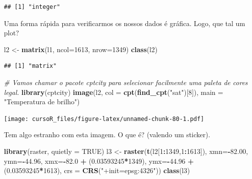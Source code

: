 \documentclass[]{book}
\newenvironment{Shaded}{\begin{snugshade}}{\end{snugshade}}
\newcommand{\KeywordTok}[1]{\textcolor[rgb]{0.13,0.29,0.53}{\textbf{#1}}}
\newcommand{\DataTypeTok}[1]{\textcolor[rgb]{0.13,0.29,0.53}{#1}}
\newcommand{\DecValTok}[1]{\textcolor[rgb]{0.00,0.00,0.81}{#1}}
\newcommand{\FloatTok}[1]{\textcolor[rgb]{0.00,0.00,0.81}{#1}}
\newcommand{\StringTok}[1]{\textcolor[rgb]{0.31,0.60,0.02}{#1}}
\newcommand{\CommentTok}[1]{\textcolor[rgb]{0.56,0.35,0.01}{\textit{#1}}}
\newcommand{\OtherTok}[1]{\textcolor[rgb]{0.56,0.35,0.01}{#1}}
\newcommand{\OperatorTok}[1]{\textcolor[rgb]{0.81,0.36,0.00}{\textbf{#1}}}
\newcommand{\NormalTok}[1]{#1}
\theoremstyle{definition}
\theoremstyle{definition}
\theoremstyle{definition}
\theoremstyle{remark}
\begin{document}
\begin{verbatim}
## [1] "integer"
\end{verbatim}

Uma forma rápida para verificarmos os nossos dados é gráfica. Logo, que
tal um plot?

\begin{Shaded}
\begin{Highlighting}[]
\NormalTok{l2 <-}\StringTok{ }\KeywordTok{matrix}\NormalTok{(l1, }\DataTypeTok{ncol=}\DecValTok{1613}\NormalTok{, }\DataTypeTok{nrow=}\DecValTok{1349}\NormalTok{)}
\KeywordTok{class}\NormalTok{(l2)}
\end{Highlighting}
\end{Shaded}

\begin{verbatim}
## [1] "matrix"
\end{verbatim}

\begin{Shaded}
\begin{Highlighting}[]
\CommentTok{# Vamos chamar o pacote cptcity para selecionar facilmente uma paleta de cores legal.}
\KeywordTok{library}\NormalTok{(cptcity)   }
\KeywordTok{image}\NormalTok{(l2,}
      \DataTypeTok{col =} \KeywordTok{cpt}\NormalTok{(}\KeywordTok{find_cpt}\NormalTok{(}\StringTok{"sat"}\NormalTok{)[}\DecValTok{8}\NormalTok{]),}
      \DataTypeTok{main =} \StringTok{"Temperatura de brilho"}\NormalTok{) }
\end{Highlighting}
\end{Shaded}

\texttt{[image: cursoR\_files/figure-latex/unnamed-chunk-80-1.pdf]}

Tem algo estranho com esta imagem. O que é? (valendo um sticker).

\begin{Shaded}
\begin{Highlighting}[]
\KeywordTok{library}\NormalTok{(raster, }\DataTypeTok{quietly =} \OtherTok{TRUE}\NormalTok{)}
\NormalTok{l3 <-}\StringTok{ }\KeywordTok{raster}\NormalTok{(}\KeywordTok{t}\NormalTok{(l2[}\DecValTok{1}\OperatorTok{:}\DecValTok{1349}\NormalTok{,}\DecValTok{1}\OperatorTok{:}\DecValTok{1613}\NormalTok{]),}
                     \DataTypeTok{xmn=}\OperatorTok{-}\FloatTok{82.00}\NormalTok{,}
                     \DataTypeTok{ymn=}\OperatorTok{-}\FloatTok{44.96}\NormalTok{,}
                     \DataTypeTok{xmx=}\OperatorTok{-}\FloatTok{82.0}  \OperatorTok{+}\StringTok{ }\NormalTok{(}\FloatTok{0.03593245}\OperatorTok{*}\DecValTok{1349}\NormalTok{), }
                     \DataTypeTok{ymx=}\OperatorTok{-}\FloatTok{44.96} \OperatorTok{+}\StringTok{ }\NormalTok{(}\FloatTok{0.03593245}\OperatorTok{*}\DecValTok{1613}\NormalTok{),}
                     \DataTypeTok{crs =} \KeywordTok{CRS}\NormalTok{(}\StringTok{"+init=epsg:4326"}\NormalTok{))}
\KeywordTok{class}\NormalTok{(l3)}
\end{Highlighting}
\end{Shaded}
\end{document}
